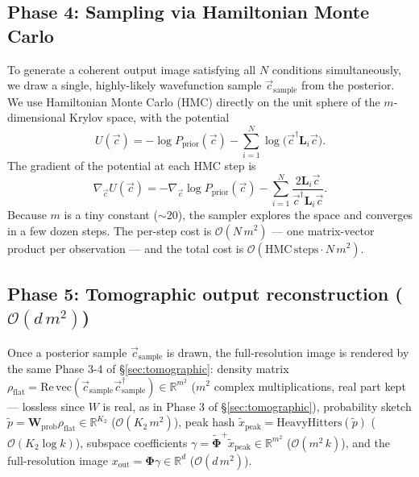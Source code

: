 \documentclass[11pt, a4paper]{article}
\newcommand{\Rset}{\mathbb{R}}
\begin{document}
\subsection{Phase 4: Sampling via Hamiltonian Monte Carlo}

To generate a coherent output image satisfying all $N$ conditions
simultaneously, we draw a single, highly-likely wavefunction sample
$\vec c_{\mathrm{sample}}$ from the posterior. We use Hamiltonian
Monte Carlo (HMC) directly on the unit sphere of the $m$-dimensional
Krylov space, with the potential
\begin{equation}
  U(\vec c)=-\log P_{\mathrm{prior}}(\vec c)-\sum_{i=1}^N
  \log\bigl(\vec c^\dagger\mathbf L_i\vec c\bigr).
  \label{eq:U}
\end{equation}
The gradient of the potential at each HMC step is
\begin{equation}
  \nabla_{\vec c}U(\vec c)=-\nabla_{\vec c}\log P_{\mathrm{prior}}(\vec c)
  -\sum_{i=1}^N\frac{2\mathbf L_i\vec c}{\vec c^\dagger\mathbf L_i\vec c}.
  \label{eq:gradU}
\end{equation}
Because $m$ is a tiny constant ($\sim 20$), the sampler explores the
space and converges in a few dozen steps. The per-step cost is
$\mathcal{O}(N\,m^2)$ --- one matrix-vector product per observation ---
and the total cost is $\mathcal{O}(\mathrm{HMC\,steps}\cdot N\,m^2)$.

\subsection{Phase 5: Tomographic output reconstruction ($\mathcal{O}(d\,m^2)$)}

Once a posterior sample $\vec c_{\mathrm{sample}}$ is drawn, the
full-resolution image is rendered by the same Phase 3-4 of
\S\ref{sec:tomographic}: density matrix $\rho_{\mathrm{flat}}=
\mathrm{Re}\,\mathrm{vec}(\vec c_{\mathrm{sample}}\vec c_{\mathrm{sample}}^\dagger)
\in\Rset^{m^2}$ ($m^2$ complex multiplications, real part kept --- lossless
since $W$ is real, as in Phase 3 of \S\ref{sec:tomographic}), probability sketch
$\tilde p=\mathbf W_{\mathrm{prob}}\rho_{\mathrm{flat}}\in\Rset^{K_2}$
($\mathcal{O}(K_2\,m^2)$), peak hash
$\tilde x_{\mathrm{peak}}=\mathrm{HeavyHitters}(\tilde p)$
($\mathcal{O}(K_2\log k)$), subspace coefficients
$\gamma=\tilde{\mathbf\Phi}^+\tilde x_{\mathrm{peak}}\in\Rset^{m^2}$
($\mathcal{O}(m^2\,k)$), and the full-resolution image
$x_{\mathrm{out}}=\mathbf\Phi\gamma\in\Rset^d$
($\mathcal{O}(d\,m^2)$).
\end{document}
